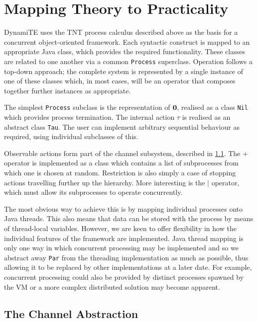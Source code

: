 \documentclass{acm_proc_article-sp}
\begin{document}
\section{Mapping Theory to Practicality}
\label{dynamite}

DynamiTE uses the TNT process calculus described above as the basis for
a concurrent object-oriented framework.  Each syntactic construct is
mapped to an appropriate Java class, which provides the required
functionality.  These classes are related to one another via a common
\texttt{Process} superclass.  Operation follows a top-down approach; the
complete system is represented by a single instance of one of these
classes which, in most cases, will be an operator that composes together
further instances as appropriate.

The simplest \texttt{Process} subclass is the representation of $\textbf{0}$,
realised as a class \texttt{Nil} which provides process termination.
The internal action $\tau$ is realised as an abstract class
\texttt{Tau}.  The user can implement arbitrary sequential behaviour as
required, using individual subclasses of this.

Observable actions form part of the channel subsystem, described in
\ref{channels}.  The $+$ operator is implemented as a class which
contains a list of subprocesses from which one is chosen at random.
Restriction is also simply a case of stopping actions travelling further
up the hierarchy.  More interesting is the $\mid$ operator, which must
allow its subprocesses to operate concurrently.

The most obvious way to achieve this is by mapping individual processes
onto Java threads.  This also means that data can be stored with the
process by means of thread-local variables.  However, we are keen to
offer flexibility in how the individual features of the framework are
implemented.  Java thread mapping is only one way in which concurrent
processing may be implemented and so we abstract away \texttt{Par} from
the threading implementation as much as possible, thus allowing it to be
replaced by other implementations at a later date.  For example,
concurrent processing could also be provided by distinct processes
spawned by the VM or a more complex distributed solution may become
apparent.

\subsection{The Channel Abstraction}
\label{channels}
\end{document}
